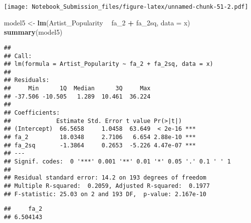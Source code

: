 \documentclass[
]{article}
\newenvironment{Shaded}{\begin{snugshade}}{\end{snugshade}}
\newcommand{\CommentTok}[1]{\textcolor[rgb]{0.56,0.35,0.01}{\textit{#1}}}
\newcommand{\DataTypeTok}[1]{\textcolor[rgb]{0.13,0.29,0.53}{#1}}
\newcommand{\DecValTok}[1]{\textcolor[rgb]{0.00,0.00,0.81}{#1}}
\newcommand{\KeywordTok}[1]{\textcolor[rgb]{0.13,0.29,0.53}{\textbf{#1}}}
\newcommand{\NormalTok}[1]{#1}
\newcommand{\OperatorTok}[1]{\textcolor[rgb]{0.81,0.36,0.00}{\textbf{#1}}}
\newcommand{\StringTok}[1]{\textcolor[rgb]{0.31,0.60,0.02}{#1}}
\begin{document}
\texttt{[image: Notebook\_Submission\_files/figure-latex/unnamed-chunk-51-2.pdf]}

\begin{Shaded}
\begin{Highlighting}[]
\NormalTok{model5 <-}\StringTok{ }\KeywordTok{lm}\NormalTok{(Artist_Popularity }\OperatorTok{~}\StringTok{ }\NormalTok{fa_}\DecValTok{2} \OperatorTok{+}\StringTok{ }\NormalTok{fa_2sq, }\DataTypeTok{data =}\NormalTok{ x)}
\KeywordTok{summary}\NormalTok{(model5)}
\end{Highlighting}
\end{Shaded}

\begin{verbatim}
## 
## Call:
## lm(formula = Artist_Popularity ~ fa_2 + fa_2sq, data = x)
## 
## Residuals:
##     Min      1Q  Median      3Q     Max 
## -37.506 -10.505   1.289  10.461  36.224 
## 
## Coefficients:
##             Estimate Std. Error t value Pr(>|t|)    
## (Intercept)  66.5658     1.0458  63.649  < 2e-16 ***
## fa_2         18.0348     2.7106   6.654 2.88e-10 ***
## fa_2sq       -1.3864     0.2653  -5.226 4.47e-07 ***
## ---
## Signif. codes:  0 '***' 0.001 '**' 0.01 '*' 0.05 '.' 0.1 ' ' 1
## 
## Residual standard error: 14.2 on 193 degrees of freedom
## Multiple R-squared:  0.2059, Adjusted R-squared:  0.1977 
## F-statistic: 25.03 on 2 and 193 DF,  p-value: 2.167e-10
\end{verbatim}

\begin{Shaded}
\end{Shaded}

\begin{verbatim}
##     fa_2 
## 6.504143
\end{verbatim}

\begin{Shaded}
\end{Shaded}
\end{document}
